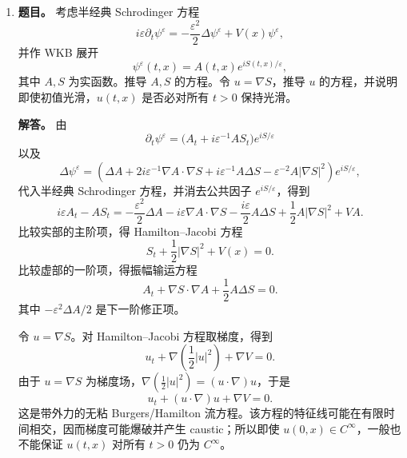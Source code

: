 ﻿\documentclass[UTF8,12pt]{ctexart}
\begin{document}
\begin{enumerate}[label=\textbf{\arabic*.},leftmargin=2.2em]
\item \textbf{题目。} 考虑半经典 Schrodinger 方程
\[
i\varepsilon\partial_t\psi^\varepsilon
=-\frac{\varepsilon^2}{2}\Delta\psi^\varepsilon
+V(x)\psi^\varepsilon,
\]
并作 WKB 展开
\[
\psi^\varepsilon(t,x)=A(t,x)e^{iS(t,x)/\varepsilon},
\]
其中 \(A,S\) 为实函数。推导 \(A,S\) 的方程。令 \(u=\nabla S\)，推导 \(u\) 的方程，并说明即使初值光滑，\(u(t,x)\) 是否必对所有 \(t>0\) 保持光滑。

\textbf{解答。} 由
\[
\partial_t\psi^\varepsilon
=\bigl(A_t+i\varepsilon^{-1}AS_t\bigr)e^{iS/\varepsilon}
\]
以及
\[
\Delta\psi^\varepsilon
=\left(\Delta A+2i\varepsilon^{-1}\nabla A\cdot\nabla S
+i\varepsilon^{-1}A\Delta S
-\varepsilon^{-2}A|\nabla S|^2\right)e^{iS/\varepsilon},
\]
代入半经典 Schrodinger 方程，并消去公共因子 \(e^{iS/\varepsilon}\)，得到
\[
i\varepsilon A_t-AS_t
=-\frac{\varepsilon^2}{2}\Delta A
-i\varepsilon\nabla A\cdot\nabla S
-\frac{i\varepsilon}{2}A\Delta S
+\frac12A|\nabla S|^2+VA.
\]
比较实部的主阶项，得 Hamilton--Jacobi 方程
\[
S_t+\frac12|\nabla S|^2+V(x)=0.
\]
比较虚部的一阶项，得振幅输运方程
\[
A_t+\nabla S\cdot\nabla A+\frac12A\Delta S=0.
\]
其中 \(-\varepsilon^2\Delta A/2\) 是下一阶修正项。

令 \(u=\nabla S\)。对 Hamilton--Jacobi 方程取梯度，得到
\[
u_t+\nabla\left(\frac12|u|^2\right)+\nabla V=0.
\]
由于 \(u=\nabla S\) 为梯度场，\(\nabla(\frac12|u|^2)=(u\cdot\nabla)u\)，于是
\[
u_t+(u\cdot\nabla)u+\nabla V=0.
\]
这是带外力的无粘 Burgers/Hamilton 流方程。该方程的特征线可能在有限时间相交，因而梯度可能爆破并产生 caustic；所以即使 \(u(0,x)\in C^\infty\)，一般也不能保证 \(u(t,x)\) 对所有 \(t>0\) 仍为 \(C^\infty\)。
\end{enumerate}
\end{document}
